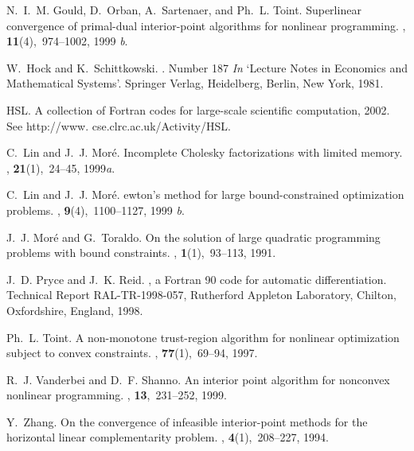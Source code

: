 \documentclass[twoside]{article}
\begin{document}
\begin{thebibliography}{xx}
N.~I.~M. Gould, D.~Orban, A.~Sartenaer, and Ph.~L. Toint.
\newblock Superlinear convergence of primal-dual interior-point algorithms for
  nonlinear programming.
, {\bf 11}(4),~974--1002, 1999{\em
  b}.

W.~Hock and K.~Schittkowski.
.
\newblock Number 187 {\em In} `Lecture Notes in Economics and Mathematical
  Systems'. Springer Verlag, Heidelberg, Berlin, New York, 1981.

HSL.
\newblock A collection of {F}ortran codes for large-scale scientific
  computation, 2002.
\newblock See http://www. cse.clrc.ac.uk/Activity/HSL.

C.~Lin and J.~J. Mor\'{e}.
\newblock Incomplete {C}holesky factorizations with limited memory.
, {\bf 21}(1),~24--45,
  1999{\em a}.

C.~Lin and J.~J. Mor\'{e}.
ewton's method for large bound-constrained optimization problems.
, {\bf 9}(4),~1100--1127, 1999{\em
  b}.

J.~J. Mor\'{e} and G.~Toraldo.
\newblock On the solution of large quadratic programming problems with bound
  constraints.
, {\bf 1}(1),~93--113, 1991.

J.~D. Pryce and J.~K. Reid.
, a {F}ortran 90 code for automatic differentiation.
\newblock Technical Report RAL-TR-1998-057, Rutherford Appleton Laboratory,
  Chilton, Oxfordshire, England, 1998.

Ph.~L. Toint.
\newblock A non-monotone trust-region algorithm for nonlinear optimization
  subject to convex constraints.
, {\bf 77}(1),~69--94, 1997.

R.~J. Vanderbei and D.~F. Shanno.
\newblock An interior point algorithm for nonconvex nonlinear programming.
, {\bf
  13},~231--252, 1999.

Y.~Zhang.
\newblock On the convergence of infeasible interior-point methods for the
  horizontal linear complementarity problem.
, {\bf 4}(1),~208--227, 1994.

\end{thebibliography}
\end{document}
